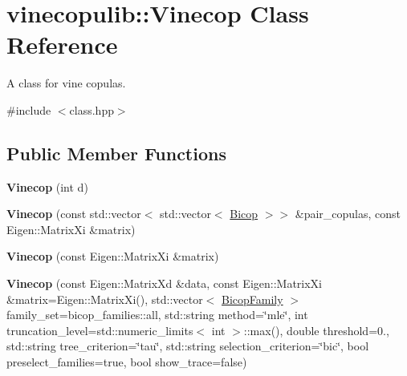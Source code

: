 \hypertarget{classvinecopulib_1_1_vinecop}{}\section{vinecopulib\+:\+:Vinecop Class Reference}
\label{classvinecopulib_1_1_vinecop}


A class for vine copulas.  




{\ttfamily \#include $<$class.\+hpp$>$}

\subsection*{Public Member Functions}
\begin{DoxyCompactItemize}
\item 
{\bfseries Vinecop} (int d)\hypertarget{classvinecopulib_1_1_vinecop_a7c6bae90feba9d70bf692e4d50d02bc7}{}\label{classvinecopulib_1_1_vinecop_a7c6bae90feba9d70bf692e4d50d02bc7}

\item 
{\bfseries Vinecop} (const std\+::vector$<$ std\+::vector$<$ \hyperlink{classvinecopulib_1_1_bicop}{Bicop} $>$$>$ \&pair\+\_\+copulas, const Eigen\+::\+Matrix\+Xi \&matrix)\hypertarget{classvinecopulib_1_1_vinecop_a013a9d4eef7eb5e615a18bb3c36fd5dc}{}\label{classvinecopulib_1_1_vinecop_a013a9d4eef7eb5e615a18bb3c36fd5dc}

\item 
{\bfseries Vinecop} (const Eigen\+::\+Matrix\+Xi \&matrix)\hypertarget{classvinecopulib_1_1_vinecop_a561fc84ab874520e6dab9107fc45579a}{}\label{classvinecopulib_1_1_vinecop_a561fc84ab874520e6dab9107fc45579a}

\item 
{\bfseries Vinecop} (const Eigen\+::\+Matrix\+Xd \&data, const Eigen\+::\+Matrix\+Xi \&matrix=Eigen\+::\+Matrix\+Xi(), std\+::vector$<$ \hyperlink{family_8hpp_a42e95cc06d33896199caab0c11ad44f3}{Bicop\+Family} $>$ family\+\_\+set=bicop\+\_\+families\+::all, std\+::string method=\char`\"{}mle\char`\"{}, int truncation\+\_\+level=std\+::numeric\+\_\+limits$<$ int $>$\+::max(), double threshold=0., std\+::string tree\+\_\+criterion=\char`\"{}tau\char`\"{}, std\+::string selection\+\_\+criterion=\char`\"{}bic\char`\"{}, bool preselect\+\_\+families=true, bool show\+\_\+trace=false)\hypertarget{classvinecopulib_1_1_vinecop_ae74d750f9f59c33cbb2047347c44a530}{}\label{classvinecopulib_1_1_vinecop_ae74d750f9f59c33cbb2047347c44a530}


\end{DoxyCompactItemize}
